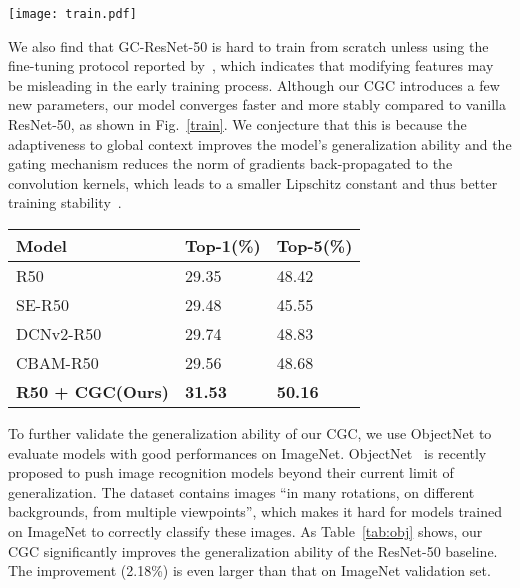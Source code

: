 \documentclass[runningheads]{llncs}
\begin{document}
\begin{figure*}[t]
\begin{center}
\texttt{[image: train.pdf]}
\end{center}
\caption{\label{train}The training curves of ResNet-50 and ResNet-50 + CGC (ours) on ImageNet under the default training setting.}
\end{figure*}

We also find that GC-ResNet-50 is hard to train from scratch unless using the fine-tuning protocol reported by~\cite{cao2019gcnet}, which indicates that modifying features may be misleading in the early training process. Although our CGC introduces a few new parameters, our model converges faster and more stably compared to vanilla ResNet-50, as shown in Fig.~\ref{train}. We conjecture that this is because the adaptiveness to global context improves the model's generalization ability and the gating mechanism reduces the norm of gradients back-propagated to the convolution kernels, which leads to a smaller Lipschitz constant and thus better training stability~\cite{santurkar2018does,qiao2019weight}.

\begin{table*}[t]
\caption{Image classification results on ObjectNet. Bold indicates the best result.} 
\label{tab:obj}
\scriptsize
\begin{center}
\begin{tabular}{lll}
\hline
  Model   & Top-1(\%) & Top-5(\%) \\ \hline
  R50~\cite{He_2016_CVPR}         & 29.35 & 48.42 \\
  SE-R50~\cite{hu2018squeeze} & 29.48 & 45.55 \\
  DCNv2-R50~\cite{zhu2019deformable} & 29.74 & 48.83 \\
  CBAM-R50~\cite{woo2018cbam} & 29.56 & 48.68 \\
  \textbf{R50 + CGC(Ours)} & \textbf{31.53} & \textbf{50.16}
  
\\ \hline 

\hline
\end{tabular}
\end{center}

\end{table*}

To further validate the generalization ability of our CGC, we use ObjectNet to evaluate models with good performances on ImageNet. ObjectNet~\cite{barbu2019objectnet} is recently proposed to push image recognition models beyond their current limit of generalization. The dataset contains images ``in many rotations, on different backgrounds, from multiple viewpoints'', which makes it hard for models trained on ImageNet to correctly classify these images. As Table~\ref{tab:obj} shows, our CGC significantly improves the generalization ability of the ResNet-50 baseline. The improvement (2.18\%) is even larger than that on ImageNet validation set.
\end{document}
